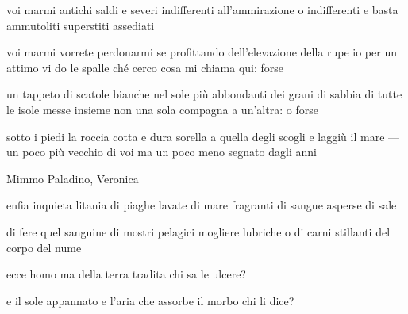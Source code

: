 \begin{poem}
	\begin{stanza}
		voi marmi antichi saldi e severi\verseline
		indifferenti all'ammirazione\verseline
		o indifferenti e basta\verseline
		ammutoliti superstiti assediati
	\end{stanza}

	\begin{stanza}
		voi marmi vorrete perdonarmi\verseline
		se profittando dell'elevazione della rupe\verseline
		io per un attimo vi do le spalle\verseline
		ché cerco cosa mi chiama qui: forse
	\end{stanza}

	\begin{stanza}
		un tappeto di scatole bianche nel sole\verseline
		più abbondanti dei grani di sabbia\verseline
		di tutte le isole messe insieme\verseline
		non una sola compagna a un'altra: o forse
	\end{stanza}

	\begin{stanza}
		sotto i piedi la roccia cotta e dura\verseline
		sorella a quella degli scogli\verseline
		e laggiù il mare — un poco più vecchio di voi\verseline
		ma un poco meno segnato dagli anni
	\end{stanza}
\end{poem}

\clearpage


\begin{artItem}
	Mimmo Paladino, Veronica
\end{artItem}

\begin{poem}
	\begin{stanza}
		enfia inquieta\verseline
		litania di piaghe\verseline
		lavate di mare\verseline
		fragranti di sangue\verseline
		asperse di sale
	\end{stanza}

	\begin{stanza}
		di fere quel sanguine\verseline
		di mostri pelagici\verseline
		mogliere lubriche\verseline
		o di carni stillanti\verseline
		del corpo del nume
	\end{stanza}

	\begin{stanza}
		ecce homo\verseline
		ma della terra tradita\verseline
		chi sa le ulcere?
	\end{stanza}

	\begin{stanza}
		e il sole appannato\verseline
		e l’aria che assorbe il morbo\verseline
		chi li dice?
	\end{stanza}
\end{poem}
